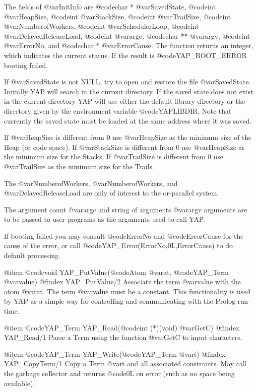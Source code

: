 {{{{{{{{{The fields of @var{InitInfo} are @code{char *} @var{SavedState},
@code{int} @var{HeapSize}, @code{int} @var{StackSize}, @code{int}
@var{TrailSize}, @code{int} @var{NumberofWorkers}, @code{int}
@var{SchedulerLoop}, @code{int} @var{DelayedReleaseLoad}, @code{int}
@var{argc}, @code{char **} @var{argv}, @code{int} @var{ErrorNo}, and
@code{char *} @var{ErrorCause}. The function returns an integer, which
indicates the current status. If the result is @code{YAP_BOOT_ERROR}
booting failed.

If @var{SavedState} is not NULL, try to open and restore the file
@var{SavedState}. Initially YAP will search in the current directory. If
the saved state does not exist in the current directory YAP will use
either the default library directory or the directory given by the
environment variable @code{YAPLIBDIR}. Note that currently
the saved state must be loaded at the same address where it was saved.

If @var{HeapSize} is different from 0 use @var{HeapSize} as the minimum
size of the Heap (or code space). If @var{StackSize} is different from 0
use @var{HeapSize} as the minimum size for the Stacks. If
@var{TrailSize} is different from 0 use @var{TrailSize} as the minimum
size for the Trails.

The @var{NumberofWorkers}, @var{NumberofWorkers}, and
@var{DelayedReleaseLoad} are only of interest to the or-parallel system.

The argument count @var{argc} and string of arguments @var{argv}
arguments are to be passed to user programs as the arguments used to
call YAP.

If booting failed you may consult @code{ErrorNo} and @code{ErrorCause}
for the cause of the error, or call
@code{YAP_Error(ErrorNo,0L,ErrorCause)} to do default processing. 


@item  @code{void} YAP_PutValue(@code{Atom} @var{at}, @code{YAP_Term} @var{value})
@findex  YAP_PutValue/2
Associate the term @var{value} with the atom @var{at}. The term
@var{value} must be a constant. This functionality is used by YAP as a
simple way for controlling and communicating with the Prolog run-time.

@item  @code{YAP_Term} YAP_Read(@code{int (*)(void)} @var{GetC})
@findex  YAP_Read/1
Parse a Term  using the function @var{GetC} to input characters.

@item  @code{YAP_Term} YAP_Write(@code{YAP_Term} @var{t})
@findex  YAP_CopyTerm/1
Copy a Term @var{t} and all associated constraints. May call the garbage
collector and returns @code{0L} on error (such as no space being
available).

}}}}}}}}}
